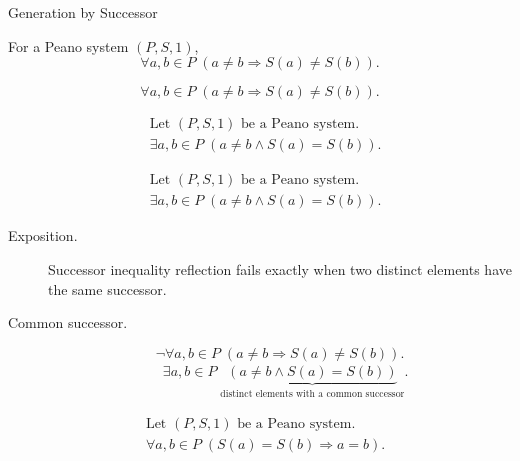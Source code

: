 \begin{topicbox}{Generation by Successor}
\begin{remark*}
For a Peano system $(P,S,1)$,
\[
\forall a,b \in P\;(a\neq b \Longrightarrow S(a)\neq S(b)).
\]
\end{remark*}

\begin{remark*}
\[
\forall a,b \in P\;(a\neq b \Longrightarrow S(a)\neq S(b)).
\]
\end{remark*}

\begin{remark*}
\[
\begin{aligned}
&\text{Let } (P,S,1) \text{ be a Peano system.}\\
&\exists a,b \in P\;(a\neq b \land S(a)=S(b)).
\end{aligned}
\]
\end{remark*}

\begin{remark*}
\[
\begin{aligned}
&\text{Let } (P,S,1) \text{ be a Peano system.}\\
&\exists a,b \in P\;(a\neq b \land S(a)=S(b)).
\end{aligned}
\]
\end{remark*}

\begin{remark*}
\begin{description}
  \item[Exposition.]
  Successor inequality reflection fails exactly when two distinct elements
  have the same successor.
  \item[Common successor.]
  \[
  \neg\forall a,b \in P\;(a\neq b \Longrightarrow S(a)\neq S(b)).
  \]
  \[
  \begin{aligned}
  &\exists a,b \in P\;
  \underbrace{(a\neq b \land S(a)=S(b))}_{\text{distinct elements with a common successor}}.
  \end{aligned}
  \]
\end{description}
\end{remark*}

\begin{remark*}
\[
\begin{aligned}
&\text{Let } (P,S,1) \text{ be a Peano system.}\\
&\forall a,b \in P\;(S(a)=S(b) \Longrightarrow a=b).
\end{aligned}
\]
\end{remark*}


\end{topicbox}
